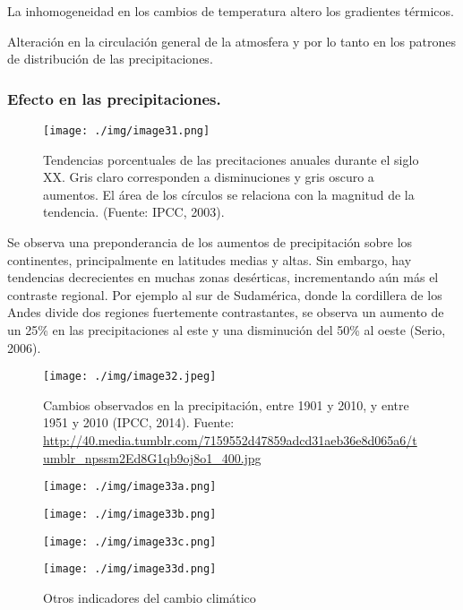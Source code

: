 \documentclass[
  a4paper,12pt]{extarticle}
\begin{document}
La inhomogeneidad en los cambios de temperatura altero los gradientes
térmicos.

Alteración en la circulación general de la atmosfera y por lo tanto en
los patrones de distribución de las precipitaciones.

\hypertarget{efecto-en-las-precipitaciones.}{%
\subsubsection{Efecto en las
precipitaciones.}\label{efecto-en-las-precipitaciones.}}

\begin{figure}
\centering
\texttt{[image: ./img/image31.png]}
\caption{Tendencias porcentuales de las precitaciones anuales durante el
siglo XX. Gris claro corresponden a disminuciones y gris oscuro a
aumentos. El área de los círculos se relaciona con la magnitud de la
tendencia. (Fuente: IPCC, 2003).}
\end{figure}

Se observa una preponderancia de los aumentos de precipitación sobre los
continentes, principalmente en latitudes medias y altas. Sin embargo,
hay tendencias decrecientes en muchas zonas desérticas, incrementando
aún más el contraste regional. Por ejemplo al sur de Sudamérica, donde
la cordillera de los Andes divide dos regiones fuertemente
contrastantes, se observa un aumento de un 25\% en las precipitaciones
al este y una disminución del 50\% al oeste (Serio, 2006).

\begin{figure}
\centering
\texttt{[image: ./img/image32.jpeg]}
\caption{Cambios observados en la precipitación, entre 1901 y 2010, y
entre 1951 y 2010 (IPCC, 2014). Fuente:
\url{http://40.media.tumblr.com/7159552d47859adcd31aeb36e8d065a6/tumblr_npssm2Ed8G1qb9oj8o1_400.jpg}}
\end{figure}

\begin{figure}
\begin{minipage}{0.48\textwidth}

\texttt{[image: ./img/image33a.png]}

\end{minipage}\hfill%
\begin{minipage}{0.48\textwidth}

\texttt{[image: ./img/image33b.png]}

\end{minipage}
\begin{minipage}{0.48\textwidth}

\texttt{[image: ./img/image33c.png]}

\end{minipage}\hfill%
\begin{minipage}{0.48\textwidth}

\texttt{[image: ./img/image33d.png]}

\end{minipage}
\caption{ Otros indicadores del cambio climático }
\end{figure}
\end{document}
